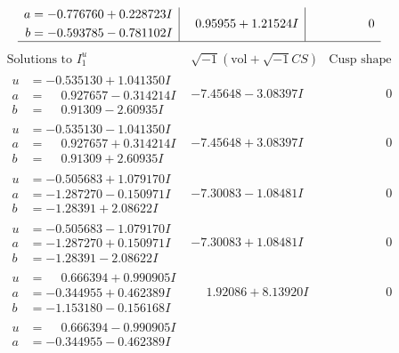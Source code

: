 \documentclass[1p]{elsarticle_modified}
\theoremstyle{definition}
\newcommand{\I}{\sqrt{-1}}
\begin{document}
$$\begin{array}{c|c|c}
\begin{aligned}
a &= -0.776760 + 0.228723 I \\
b &= -0.593785 - 0.781102 I\end{aligned}
 & \phantom{-}0.95955 + 1.21524 I & \phantom{-0.000000 } 0\\
 \hline 
 \end{array}$$\newpage$$\begin{array}{c|c|c}  
\text{Solutions to }I^u_{1}& \I (\text{vol} + \sqrt{-1}CS) & \text{Cusp shape}\\
 \hline 
\begin{aligned}
u &= -0.535130 + 1.041350 I \\
a &= \phantom{-}0.927657 - 0.314214 I \\
b &= \phantom{-}0.91309 - 2.60935 I\end{aligned}
 & -7.45648 - 3.08397 I & \phantom{-0.000000 } 0 \\ \hline\begin{aligned}
u &= -0.535130 - 1.041350 I \\
a &= \phantom{-}0.927657 + 0.314214 I \\
b &= \phantom{-}0.91309 + 2.60935 I\end{aligned}
 & -7.45648 + 3.08397 I & \phantom{-0.000000 } 0 \\ \hline\begin{aligned}
u &= -0.505683 + 1.079170 I \\
a &= -1.287270 - 0.150971 I \\
b &= -1.28391 + 2.08622 I\end{aligned}
 & -7.30083 - 1.08481 I & \phantom{-0.000000 } 0 \\ \hline\begin{aligned}
u &= -0.505683 - 1.079170 I \\
a &= -1.287270 + 0.150971 I \\
b &= -1.28391 - 2.08622 I\end{aligned}
 & -7.30083 + 1.08481 I & \phantom{-0.000000 } 0 \\ \hline\begin{aligned}
u &= \phantom{-}0.666394 + 0.990905 I \\
a &= -0.344955 + 0.462389 I \\
b &= -1.153180 - 0.156168 I\end{aligned}
 & \phantom{-}1.92086 + 8.13920 I & \phantom{-0.000000 } 0 \\ \hline\begin{aligned}
u &= \phantom{-}0.666394 - 0.990905 I \\
a &= -0.344955 - 0.462389 I \\

\end{aligned}
\end{array}$$
\end{document}
